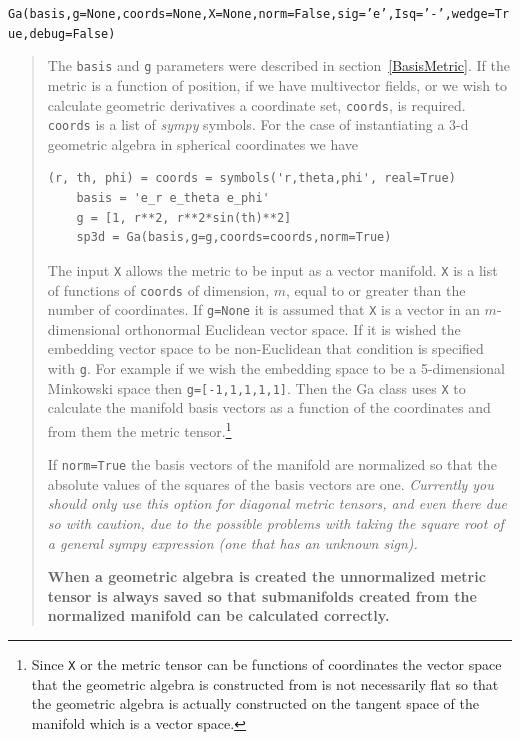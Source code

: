 \documentclass[12pt]{report}
\newcommand{\T}[1]{\texttt{#1}}
\begin{document}
\T{Ga(basis,g=None,coords=None,X=None,norm=False,sig='e',Isq='-',wedge=True,debug=False)}
\begin{quote}
   The \T{basis} and \T{g} parameters were described in section~\ref{BasisMetric}.
   If the metric is a function of position, if we have multivector fields, or we
   wish to calculate geometric derivatives a coordinate set, \T{coords}, is required.
   \T{coords} is a list of \emph{sympy} symbols.  For the case of instantiating a 3-d geometric
   algebra in spherical coordinates we have
   \begin{lstlisting}[numbers=none]
    (r, th, phi) = coords = symbols('r,theta,phi', real=True)
    basis = 'e_r e_theta e_phi'
    g = [1, r**2, r**2*sin(th)**2]
    sp3d = Ga(basis,g=g,coords=coords,norm=True)
   \end{lstlisting}
   The input \T{X} allows the metric to be input as a vector manifold.
   \T{X} is a list of functions of \T{coords} of dimension, $m$, equal to or greater
   than the number of coordinates.  If \T{g=None} it is assumed that \T{X} is a
   vector in an $m$-dimensional orthonormal Euclidean vector space. If it is wished
   the embedding vector space to be non-Euclidean that condition is specified with
   \T{g}.  For example if we wish the embedding space to be a 5-dimensional Minkowski
   space then \T{g=[-1,1,1,1,1]}.  Then the Ga class uses \T{X} to calculate the
   manifold basis vectors as a function of the coordinates and from them the metric
   tensor.\footnote{Since \T{X} or the metric tensor can be functions of coordinates
   the vector space that the geometric algebra is constructed from is not necessarily
   flat so that the geometric algebra is actually constructed on the tangent space of
   the manifold which is a vector space.}

   If \T{norm=True} the basis vectors of the manifold are normalized so that the
   absolute values of the squares of the basis vectors are one. \emph{Currently you
   should only use this option for diagonal metric tensors, and even there due so
   with caution, due to the possible
   problems with taking the square root of a general \emph{sympy} expression (one that has an
   unknown sign).}
   
   \textbf{When a geometric algebra is created the unnormalized metric tensor is always saved
   so that submanifolds created from the normalized manifold can be calculated correctly.}


\end{quote}
\end{document}
